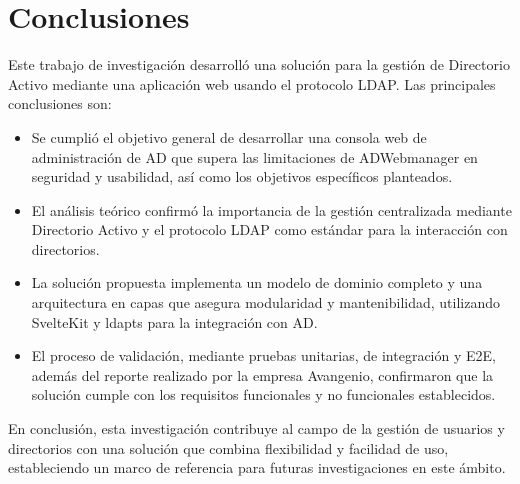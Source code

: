 \section{Conclusiones}

Este trabajo de investigación desarrolló una solución para la gestión de Directorio Activo mediante una aplicación web usando el protocolo LDAP. Las principales conclusiones son:

\begin{itemize}
    \item Se cumplió el objetivo general de desarrollar una consola web de administración de AD que supera las limitaciones de ADWebmanager en seguridad y usabilidad, así como los objetivos específicos planteados.
    \item El análisis teórico confirmó la importancia de la gestión centralizada mediante Directorio Activo y el protocolo LDAP como estándar para la interacción con directorios.
    \item La solución propuesta implementa un modelo de dominio completo y una arquitectura en capas que asegura modularidad y mantenibilidad, utilizando SvelteKit y ldapts para la integración con AD.
    \item El proceso de validación, mediante pruebas unitarias, de integración y E2E, además del reporte realizado por la empresa Avangenio, confirmaron que la solución cumple con los requisitos funcionales y no funcionales establecidos.
\end{itemize}

En conclusión, esta investigación contribuye al campo de la gestión de usuarios y directorios con una solución que combina flexibilidad y facilidad de uso, estableciendo un marco de referencia para futuras investigaciones en este ámbito.
